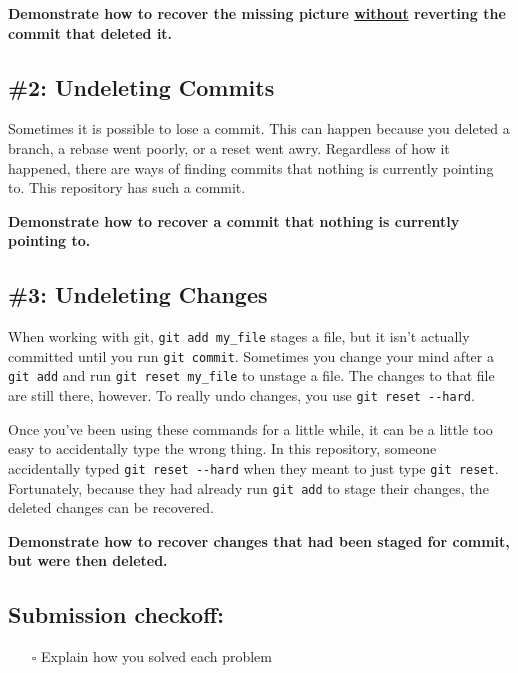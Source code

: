 \documentclass{article}
\begin{document}
\noindent
\textbf{Demonstrate how to recover the missing picture \ul{without} reverting
the commit that deleted it.}


\subsection*{\#2: Undeleting Commits}

Sometimes it is possible to lose a commit. This can happen because you deleted
a branch, a rebase went poorly, or a reset went awry. Regardless of how it
happened, there are ways of finding commits that nothing is currently pointing
to. This repository has such a commit.

\noindent
\textbf{Demonstrate how to recover a commit that nothing is currently pointing to.}


\subsection*{\#3: Undeleting Changes}

When working with git, \texttt{git~add~my\_file} stages a file, but it isn't
actually committed until you run \texttt{git~commit}. Sometimes you change
your mind after a \texttt{git~add} and run \texttt{git~reset~my\_file} to
unstage a file. The changes to that file are still there, however. To really
undo changes, you use \texttt{git~reset~-{}-hard}.

\medskip
\noindent
Once you've been using these commands for a little while, it can be a little
too easy to accidentally type the wrong thing. In this repository, someone
accidentally typed \texttt{git~reset~-{}-hard} when they meant to just type
\texttt{git~reset}. Fortunately, because they had already run \texttt{git~add}
to stage their changes, the deleted changes can be recovered.

\noindent
\textbf{Demonstrate how to recover changes that had been staged for commit,
but were then deleted.}


\subsection*{Submission checkoff:}
\begin{itemize}
  \item[$\square$] Explain how you solved each problem
\end{itemize}
\end{document}
